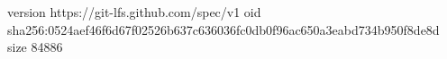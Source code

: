 version https://git-lfs.github.com/spec/v1
oid sha256:0524aef46f6d67f02526b637c636036fc0db0f96ac650a3eabd734b950f8de8d
size 84886
